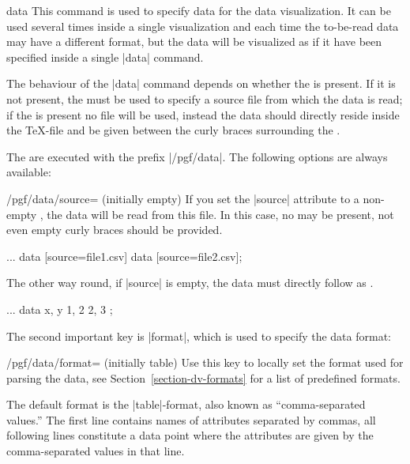 \begin{datavisualizationoperation}{data}{}
  This command is used to specify data for the data visualization. It
  can be used several times inside a single visualization and each
  time the to-be-read data may have a different format, but the data
  will be visualized as if it have been specified inside a single |data|
  command.

  The behaviour of the |data| command depends on
  whether the  is present. If it is not present, the
   must be used to specify a source file from which the
  data is read; if the  is present no file will be
  used, instead the data should directly reside inside the \TeX-file
  and be given between the curly braces surrounding the .

  The  are executed with the prefix |/pgf/data|. The
  following options are always available:
  \begin{key}{/pgf/data/source= (initially \normalfont empty)}
    If you set the |source| attribute to a non-empty ,
    the data will be read from this file. In this case, no
     may be present, not even empty curly braces
    should be provided.
\begin{codeexample}
\datavisualization ...
  data [source=file1.csv]
  data [source=file2.csv];
\end{codeexample}
    The other way round, if |source| is empty, the  data must directly
    follow as .
\begin{codeexample}
\datavisualization ...
  data {
    x, y
    1, 2
    2, 3
  };
\end{codeexample}
  \end{key}
  The second important key is |format|, which is used to specify the
  data format:
  \begin{key}{/pgf/data/format= (initially table)}
    Use this key to locally set the format used for parsing the
    data, see Section~\ref{section-dv-formats} for a list of
    predefined formats.

    The default format is the |table|-format, also known as
    ``comma-separated values.'' The first line contains names of
    attributes separated by commas, all following lines constitute a
    data point where the attributes are given by the comma-separated
    values in that line.
  \end{key}


\end{datavisualizationoperation}
